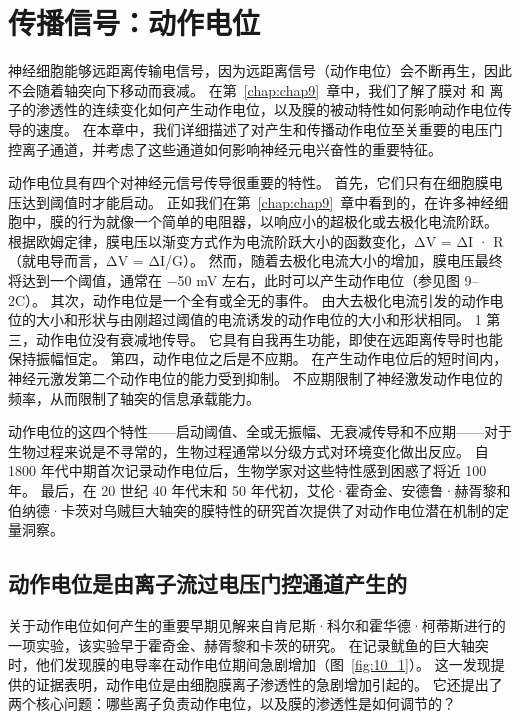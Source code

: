 \chapter{传播信号：动作电位} \label{chap:chap10}

神经细胞能够远距离传输电信号，因为远距离信号（动作电位）会不断再生，因此不会随着轴突向下移动而衰减。 
在第~\ref{chap:chap9}~章中，我们了解了膜对  和  离子的渗透性的连续变化如何产生动作电位，以及膜的被动特性如何影响动作电位传导的速度。 
在本章中，我们详细描述了对产生和传播动作电位至关重要的电压门控离子通道，并考虑了这些通道如何影响神经元电兴奋性的重要特征。


动作电位具有四个对神经元信号传导很重要的特性。
首先，它们只有在细胞膜电压达到阈值时才能启动。
正如我们在第~\ref{chap:chap9}~章中看到的，在许多神经细胞中，膜的行为就像一个简单的电阻器，以响应小的超极化或去极化电流阶跃。
根据欧姆定律，膜电压以渐变方式作为电流阶跃大小的函数变化，ΔV = ΔI · R（就电导而言，ΔV = ΔI/G）。
然而，随着去极化电流大小的增加，膜电压最终将达到一个阈值，通常在 −50 mV 左右，此时可以产生动作电位（参见图 9–2C）。
其次，动作电位是一个全有或全无的事件。
由大去极化电流引发的动作电位的大小和形状与由刚超过阈值的电流诱发的动作电位的大小和形状相同。
1 第三，动作电位没有衰减地传导。
它具有自我再生功能，即使在远距离传导时也能保持振幅恒定。
第四，动作电位之后是不应期。
在产生动作电位后的短时间内，神经元激发第二个动作电位的能力受到抑制。
不应期限制了神经激发动作电位的频率，从而限制了轴突的信息承载能力。


动作电位的这四个特性——启动阈值、全或无振幅、无衰减传导和不应期——对于生物过程来说是不寻常的，生物过程通常以分级方式对环境变化做出反应。
自 1800 年代中期首次记录动作电位后，生物学家对这些特性感到困惑了将近 100 年。
最后，在 20 世纪 40 年代末和 50 年代初，艾伦·霍奇金、安德鲁·赫胥黎和伯纳德·卡茨对乌贼巨大轴突的膜特性的研究首次提供了对动作电位潜在机制的定量洞察。



\section{动作电位是由离子流过电压门控通道产生的}

关于动作电位如何产生的重要早期见解来自肯尼斯·科尔和霍华德·柯蒂斯进行的一项实验，该实验早于霍奇金、赫胥黎和卡茨的研究。
在记录鱿鱼的巨大轴突时，他们发现膜的电导率在动作电位期间急剧增加（图~\ref{fig:10_1}）。
这一发现提供的证据表明，动作电位是由细胞膜离子渗透性的急剧增加引起的。
它还提出了两个核心问题：哪些离子负责动作电位，以及膜的渗透性是如何调节的？


